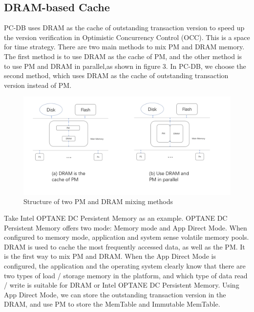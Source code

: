\subsection{DRAM-based Cache}
PC-DB uses DRAM as the cache of outstanding transaction version to speed up the version verification in Optimistic Concurrency Control (OCC). This is a space for time strategy.
There are two main methods to mix PM and DRAM memory. The first method is to use DRAM as the cache of PM, and the other method is to use PM and DRAM in parallel,as shown in figure 3. In PC-DB, we choose the second method, which uses DRAM as the cache of outstanding transaction version instead of PM.
\begin{figure}
    \centering
    \includegraphics[width=0.36\paperwidth]{USENIX/figure/PM_DRAM.png}
    \caption{Structure of two PM and DRAM mixing methods}
    \label{fig:throughput}
\end{figure}
Take Intel OPTANE DC Persistent Memory\cite{OPTANE} as an example. OPTANE DC Persistent Memory offers two mode: Memory mode and App Direct Mode. When configured to memory mode, application and system sense volatile memory pools. DRAM is used to cache the most frequently accessed data, as well as the PM. It is the first way to mix PM and DRAM. When the App Direct Mode is configured, the application and the operating system clearly know that there are two types of load / storage memory in the platform, and which type of data read / write is suitable for DRAM or Intel OPTANE DC Persistent Memory. Using App Direct Mode, we can store the outstanding transaction version in the DRAM, and use PM to store the MemTable and Immutable MemTable.

